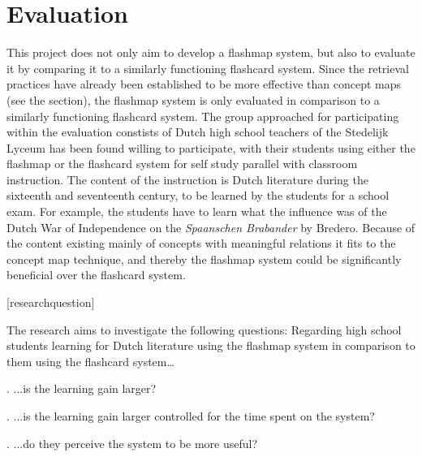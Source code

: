 \section{Evaluation}

\label{sec:intro_evaluation}

This project does not only aim to develop a flashmap system, but also to evaluate it by comparing it to a similarly functioning flashcard system. Since the retrieval practices have already been established to be more effective than concept maps (see the  section), the flashmap system is only evaluated in comparison to a similarly functioning flashcard system. The group approached for participating within the evaluation constists of Dutch high school teachers of the Stedelijk Lyceum has been found willing to participate, with their students using either the flashmap or the flashcard system for self study parallel with classroom instruction. The content of the instruction is Dutch literature during the sixteenth and seventeenth century, to be learned by the students for a school exam. For example, the students have to learn what the influence was of the Dutch War of Independence on the \emph{Spaanschen Brabander} by Bredero. Because of the content existing mainly of concepts with meaningful relations it fits to the concept map technique, and thereby the flashmap system could be significantly beneficial over the flashcard system.

\renewcommand{\theresearchquestion}{\Roman{researchquestion}}
[researchquestion]
\renewcommand{\thesubquestion}{\alph{subquestion}}

The research aims to investigate the following questions: Regarding high school students learning for Dutch literature using the flashmap system in comparison to them using the flashcard system\ldots

\label{benefit}
\label{effectiveness}
. ...is the learning gain larger?

\label{efficiency}
. ...is the learning gain larger controlled for the time spent on the system?

\label{perception}
\label{usefulness}
. ...do they perceive the system to be more useful?

